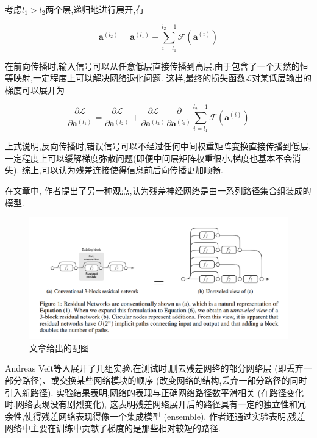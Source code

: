 考虑$l_1>l_2$两个层,递归地进行展开,有

\begin{equation}
	\mathbf{a}^{\left(l_{2}\right)}=\mathbf{a}^{\left(l_{1}\right)}+\sum_{i=l_{1}}^{l_{2}-1} \mathcal{F}\left(\mathbf{a}^{(i)}\right)
\end{equation}

在前向传播时,输入信号可以从任意低层直接传播到高层.由于包含了一个天然的恒等映射,一定程度上可以解决网络退化问题.
这样,最终的损失函数$\mathcal{L}$对某低层输出的梯度可以展开为

\begin{equation}
	\frac{\partial \mathcal{L}}{\partial \mathbf{a}^{\left(l_{1}\right)}}=\frac{\partial \mathcal{L}}{\partial \mathbf{a}^{\left(l_{2}\right)}}+\frac{\partial \mathcal{L}}{\partial \mathbf{a}^{\left(l_{2}\right)}} \frac{\partial}{\partial \mathbf{a}^{\left(l_{1}\right)}} \sum_{i=l_{1}}^{l_{2}-1} \mathcal{F}\left(\mathbf{a}^{(i)}\right)
\end{equation}

上式说明,反向传播时,错误信号可以不经过任何中间权重矩阵变换直接传播到低层,
一定程度上可以缓解梯度弥散问题(即便中间层矩阵权重很小,梯度也基本不会消失).
综上,可以认为残差连接使得信息前后向传播更加顺畅.

在文章\cite{ResidualNetworksAreExponentialEnsembles}中,
作者提出了另一种观点,认为残差神经网络是由一系列路径集合组装成的模型.

\begin{figure}[htbp]
	\centering
	\includegraphics[scale=0.55]{figures/ResNet集成神经网络解释.png}
	\caption{文章给出的配图}
\end{figure}


Andreas Veit等人展开了几组实验,在测试时,删去残差网络的部分网络层
 (即丢弃一部分路径)、或交换某些网络模块的顺序 (改变网络的结构,丢弃一部分路径的同时引入新路径).
实验结果表明,网络的表现与正确网络路径数平滑相关 (在路径变化时,网络表现没有剧烈变化),
这表明残差网络展开后的路径具有一定的独立性和冗余性,使得残差网络表现得像一个集成模型 (ensemble).
作者还通过实验表明,残差网络中主要在训练中贡献了梯度的是那些相对较短的路径.


